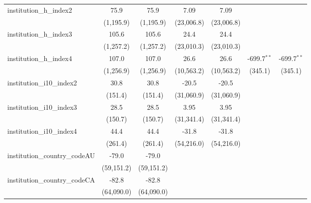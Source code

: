 \begin{tabular}{lcccccc}
   institution\_h\_index2                & 75.9         & 75.9         & 7.09        & 7.09        &                &   \\   
                                         & (1,195.9)    & (1,195.9)    & (23,006.8)  & (23,006.8)  &                &   \\   
   institution\_h\_index3                & 105.6        & 105.6        & 24.4        & 24.4        &                &   \\   
                                         & (1,257.2)    & (1,257.2)    & (23,010.3)  & (23,010.3)  &                &   \\   
   institution\_h\_index4                & 107.0        & 107.0        & 26.6        & 26.6        & -699.7$^{**}$  & -699.7$^{**}$\\   
                                         & (1,256.9)    & (1,256.9)    & (10,563.2)  & (10,563.2)  & (345.1)        & (345.1)\\   
   institution\_i10\_index2              & 30.8         & 30.8         & -20.5       & -20.5       &                &   \\   
                                         & (151.4)      & (151.4)      & (31,060.9)  & (31,060.9)  &                &   \\   
   institution\_i10\_index3              & 28.5         & 28.5         & 3.95        & 3.95        &                &   \\   
                                         & (150.7)      & (150.7)      & (31,341.4)  & (31,341.4)  &                &   \\   
   institution\_i10\_index4              & 44.4         & 44.4         & -31.8       & -31.8       &                &   \\   
                                         & (261.4)      & (261.4)      & (54,216.0)  & (54,216.0)  &                &   \\   
   institution\_country\_codeAU          & -79.0        & -79.0        &             &             &                &   \\   
                                         & (59,151.2)   & (59,151.2)   &             &             &                &   \\   
   institution\_country\_codeCA          & -82.8        & -82.8        &             &             &                &   \\   
                                         & (64,090.0)   & (64,090.0)   &             &             &                &   \\   

\end{tabular}
